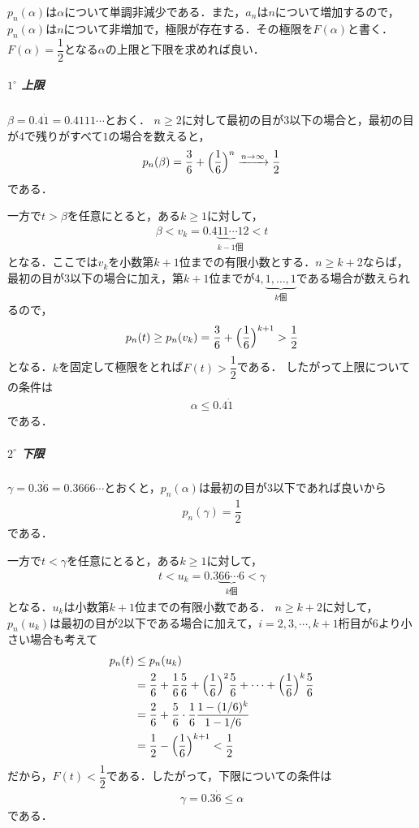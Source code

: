 \documentclass[../../main.tex]{subfiles}
\begin{document}
$p_n(\alpha)$は$\alpha$について単調非減少である．また，$a_n$は$n$について増加するので，$p_n(\alpha)$は$n$について非増加で，極限が存在する．その極限を$F(\alpha)$と書く．$F(\alpha)=\dfrac{1}{2}$となる$\alpha$の上限と下限を求めれば良い．

\subparagraph{$1^\circ$ 上限}

$\beta=0.4\dot{1}=0.4111\cdots$とおく．
$n\ge2$に対して最初の目が$3$以下の場合と，最初の目が$4$で残りがすべて$1$の場合を数えると，
\begin{align}
  p_n(\beta)
  =\dfrac{3}{6}+\Bigl(\dfrac{1}{6}\Bigr)^n
  \xrightarrow{n\to\infty}\dfrac{1}{2}
\end{align}
である．

一方で$t>\beta$を任意にとると，ある$k\ge1$に対して，
\begin{align}
  \beta<v_k=0.4\underbrace{11\cdots1}_{k-1\text{個}}2<t
\end{align}
となる．ここでは$v_k$を小数第$k+1$位までの有限小数とする．$n\ge k+2$ならば，最初の目が$3$以下の場合に加え，第$k+1$位までが$4,\underbrace{1,\ldots,1}_{k\text{個}}$である場合が数えられるので，
\begin{align}
  p_n(t)\ge p_n(v_k)
  =\dfrac{3}{6}+\Bigl(\dfrac{1}{6}\Bigr)^{k+1}
  >\dfrac{1}{2}
\end{align}
となる．$k$を固定して極限をとれば$F(t)>\dfrac{1}{2}$である．
したがって上限についての条件は
\begin{align}
  \alpha\le 0.4\dot{1} \label{eq:6}
\end{align}
である．

\subparagraph{$2^\circ$ 下限}

$\gamma=0.3\dot{6}=0.3666\cdots$とおくと，$p_n(\alpha)$は最初の目が$3$以下であれば良いから
\begin{align}
  p_n(\gamma)=\dfrac{1}{2}
\end{align}
である．

一方で$t<\gamma$を任意にとると，ある$k\ge1$に対して，
\begin{align}
  t<u_k=0.3\underbrace{66\cdots6}_{k\text{個}}<\gamma
\end{align}
となる．$u_k$は小数第$k+1$位までの有限小数である．
$n\ge k+2$に対して，$p_n(u_k)$は最初の目が$2$以下である場合に加えて，$i=2,3,\cdots,k+1$桁目が$6$より小さい場合も考えて
\begin{align}
  p_n(t)&\le p_n(u_k)\\
  &=\dfrac{2}{6}
  +\dfrac{1}{6}\dfrac{5}{6}
  +\Bigl(\dfrac{1}{6}\Bigr)^2\dfrac{5}{6}
  +\cdots+\Bigl(\dfrac{1}{6}\Bigr)^k\dfrac{5}{6}\\
  &=\dfrac{2}{6}
  +\dfrac{5}{6}\cdot\dfrac{1}{6}
  \dfrac{1-(1/6)^k}{1-1/6}\\
  &=\dfrac{1}{2}-\Bigl(\dfrac{1}{6}\Bigr)^{k+1}
  <\dfrac{1}{2}
\end{align}
だから，$F(t)<\dfrac{1}{2}$である．したがって，下限についての条件は
\begin{align}
  \gamma = 0.3\dot{6} \le \alpha \label{eq:7}
\end{align}
である．
\casesend
\end{document}
